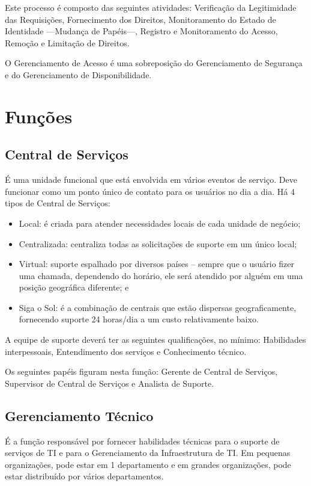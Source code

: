 Este processo é composto das seguintes atividades: Verificação da Legitimidade
das Requisições, Fornecimento dos Direitos, Monitoramento do Estado de
Identidade ---Mudança de Papéis---, Registro e Monitoramento do Acesso, Remoção
e Limitação de Direitos.

O Gerenciamento de Acesso é uma sobreposição do Gerenciamento de Segurança e do
Gerenciamento de Disponibilidade.


\section{Funções}
\subsection{Central de Serviços}
É uma unidade funcional que está envolvida em vários eventos de serviço. Deve
funcionar como um ponto único de contato para os usuários no dia a dia. Há 4
tipos de Central de Serviços:
\begin{itemize}
    \item Local: é criada para atender necessidades locais de cada unidade de
        negócio;
    \item Centralizada: centraliza todas as solicitações de suporte em um único
        local;
    \item Virtual: suporte espalhado por diversos países – sempre que o usuário
        fizer uma chamada, dependendo do horário, ele será atendido por alguém
        em uma posição geográfica diferente; e
    \item Siga o Sol: é a combinação de centrais que estão dispersas
        geograficamente, fornecendo suporte 24 horas/dia a um custo
        relativamente baixo.
\end{itemize}

A equipe de suporte deverá ter as seguintes qualificações, no mínimo:
Habilidades interpessoais, Entendimento dos serviços e Conhecimento técnico.

Os seguintes papéis figuram nesta função: Gerente de Central de Serviços,
Supervisor de Central de Serviços e Analista de Suporte.


\subsection{Gerenciamento Técnico}
É a função responsável por fornecer habilidades técnicas para o suporte de
serviços de TI e para o Gerenciamento da Infraestrutura de TI. Em pequenas
organizações, pode estar em 1 departamento e em grandes organizações, pode
estar distribuído por vários departamentos.


